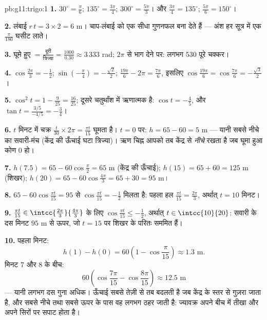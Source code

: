 \begin{solution}{pb:g11:trigo:1}
\textbf{1.} $30^\circ = \frac{\pi}{6}$; $135^\circ =
\frac{3\pi}{4}$; $300^\circ = \frac{5\pi}{3}$। और $\frac{3\pi}{4} = 135^\circ$; $\frac{5\pi}{6} = 150^\circ$।

\textbf{2.} लंबाई $r\,t = 3 \times 2 = 6$ m।  चाप-लंबाई को एक सीधा गुणनफल बना देते हैं
--- अंश हर सूत्र में एक $\frac{\pi}{180}$ घसीट लाते।

\textbf{3.} घूमे हुए  $= \frac{\text{दूरी}}
{\text{त्रिज्या}} = \frac{1000}{0.30} \approx 3\,333$ rad; $2\pi$ से भाग देने पर: लगभग $530$
पूरे चक्कर।

\textbf{4.} $\cos\frac{2\pi}{3} = -\frac12$; $\sin\left(-\frac\pi4\right) = -\frac{\sqrt2}{2}$; $\frac{19\pi}{6} - 2\pi = \frac{7\pi}{6}$, इसलिए $\cos\frac{19\pi}{6} = \cos\frac{7\pi}{6} =
-\frac{\sqrt3}{2}$।

\textbf{5.} $\cos^2 t = 1 - \frac{9}{25} = \frac{16}{25}$; दूसरे चतुर्थांश में  ऋणात्मक है: $\cos t = -\frac45$, और $\tan t = \frac{3/5}{-4/5} = -\frac34$।

\textbf{6.} $t$ मिनट में चक्र $\frac{t}{30} \times 2\pi = \frac{\pi t}{15}$ घूमता है। $t = 0$ पर: $h = 65 - 60 = 5$ m --- यानी
सबसे नीचे का सवारी-मंच (केंद्र की ऊँचाई घटा त्रिज्या)। ऋण चिह्न आपको तब
केंद्र से \emph{नीचे} रखता है जब घूमा हुआ कोण $0$ हो।

\textbf{7.} $h(7.5) = 65 - 60\cos\frac{\pi}{2} = 65$ m (केंद्र की ऊँचाई); $h(15) = 65 + 60 = 125$ m (शिखर); $h(20) = 65 - 60\cos\frac{4\pi}{3} = 65 + 30 = 95$ m।

\textbf{8.} $65 - 60\cos\frac{\pi t}{15} = 95$ से $\cos\frac{\pi t}{15} = -\frac12$ मिलता है: पहला हल $\frac{\pi t}{15} = \frac{2\pi}{3}$, अर्थात् $t = 10$ मिनट।

\textbf{9.} $\frac{\pi t}{15} \in \intcc{\frac{2\pi}{3}}{\frac{4\pi}{3}}$ के लिए $\cos\frac{\pi t}{15} \leq -\frac12$, अर्थात् $t \in \intcc{10}{20}$: सवारी के दस मिनट $95$ m से
ऊपर, जो $t = 15$ पर शिखर के परितः सममित हैं।

\textbf{10.} पहला मिनट:
\[
h(1) - h(0) = 60\left(1 - \cos\frac{\pi}{15}\right)
\approx 1.3 \text{ m}.
\]
मिनट $7$ और $8$ के बीच:
\[
60\left(\cos\frac{7\pi}{15} - \cos\frac{8\pi}{15}\right)
\approx 12.5 \text{ m}
\]
--- यानी लगभग दस गुना अधिक। ऊँचाई सबसे तेज़ी से तब बदलती है जब केंद्र के
स्तर से गुज़रा जाता है, और सबसे नीचे तथा सबसे ऊपर के पास वह लगभग ठहर जाती
है: ज्यावक्र अपने बीच में तीखा और अपने सिरों पर सपाट होता है।


\end{solution}
